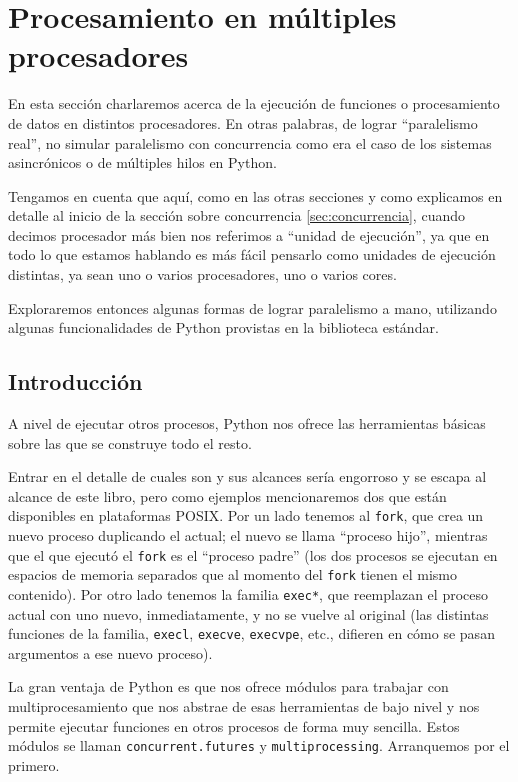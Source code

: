 \section{Procesamiento en múltiples procesadores}\label{sec:multiprocessing}

En esta sección charlaremos acerca de la ejecución de funciones o procesamiento de datos en distintos procesadores. En otras palabras, de lograr ``paralelismo real'', no simular paralelismo con concurrencia como era el caso de los sistemas asincrónicos o de múltiples hilos en Python.

Tengamos en cuenta que aquí, como en las otras secciones y como explicamos en detalle al inicio de la sección sobre concurrencia \ref{sec:concurrencia}, cuando decimos procesador más bien nos referimos a ``unidad de ejecución'', ya que en todo lo que estamos hablando es más fácil pensarlo como unidades de ejecución distintas, ya sean uno o varios procesadores, uno o varios cores.

Exploraremos entonces algunas formas de lograr paralelismo a mano, utilizando algunas funcionalidades de Python provistas en la biblioteca estándar.


\subsection{Introducción}

A nivel de ejecutar otros procesos, Python nos ofrece las herramientas básicas sobre las que se construye todo el resto.

Entrar en el detalle de cuales son y sus alcances sería engorroso y se escapa al alcance de este libro, pero como ejemplos mencionaremos dos que están disponibles en plataformas POSIX. Por un lado tenemos al \texttt{fork}, que crea un nuevo proceso duplicando el actual; el nuevo se llama ``proceso hijo'', mientras que el que ejecutó el \texttt{fork} es el ``proceso padre'' (los dos procesos se ejecutan en espacios de memoria separados que al momento del \texttt{fork} tienen el mismo contenido). Por otro lado tenemos la familia \texttt{exec*}, que reemplazan el proceso actual con uno nuevo, inmediatamente, y no se vuelve al original (las distintas funciones de la familia, \texttt{execl}, \texttt{execve}, \texttt{execvpe}, etc., difieren en cómo se pasan argumentos a ese nuevo proceso).

La gran ventaja de Python es que nos ofrece módulos para trabajar con multiprocesamiento que nos abstrae de esas herramientas de bajo nivel y nos permite ejecutar funciones en otros procesos de forma muy sencilla. Estos módulos se llaman \texttt{concurrent.futures} y \texttt{multiprocessing}. Arranquemos por el primero.

